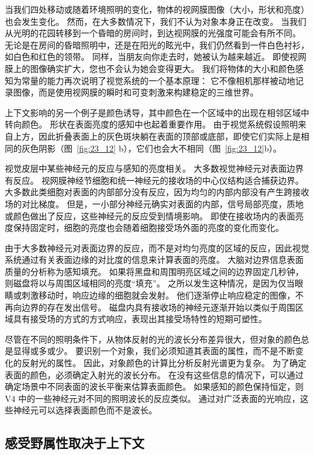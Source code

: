 当我们四处移动或随着环境照明的变化，物体的视网膜图像（大小，形状和亮度）也会发生变化。
然而，在大多数情况下，我们不认为对象本身正在改变。 
当我们从光明的花园转移到一个昏暗的房间时，到达视网膜的光强度可能会有所不同。
无论是在房间的昏暗照明中，还是在阳光的眩光中，我们仍然看到一件白色衬衫，如白色和红色的领带。
同样，当朋友向你走去时，她被认为越来越近。
即使视网膜上的图像确实扩大，您也不会认为她会变得更大。
我们将物体的大小和颜色感知为常量的能力再次说明了视觉系统的一个基本原理：
它不像相机那样被动地记录图像，而是使用视网膜的瞬时和可变刺激来构建稳定的三维世界。


上下文影响的另一个例子是颜色诱导，其中颜色在一个区域中的出现在相邻区域中转向颜色。
形状在表面亮度的感知中也起着重要作用。
由于视觉系统假设照明来自上方，因此折叠表面上的灰色斑块躺在表面的顶部或底部，即使它们实际上是相同的灰色阴影（图~\ref{fig:23_12}
b），它们也会大不相同（图~\ref{fig:23_12}b）。


视觉皮层中某些神经元的反应与感知的亮度相关。
大多数视觉神经元对表面边界有反应。
视网膜神经节细胞和统一神经元的接收场的中心仪结构适合捕获边界。
大多数此类细胞对表面的内部部分没有反应，因为均匀的内部内部没有产生跨接收场的对比梯度。
但是，一小部分神经元确实对表面的内部，信号局部亮度，质地或颜色做出了反应，这些神经元的反应受到情境影响。
即使在接收场内的表面亮度保持固定时，细胞的亮度也会随着细胞接受场外面的亮度的变化而变化。


由于大多数神经元对表面边界的反应，而不是对均匀亮度的区域的反应，因此视觉系统通过有关表面边缘的对比度的信息来计算表面的亮度。
大脑对边界信息表面质量的分析称为感知填充。
如果将黑盘和周围明亮区域之间的边界固定几秒钟，则磁盘将以与周围区域相同的亮度“填充”。
之所以发生这种情况，是因为仅当眼睛或刺激移动时，响应边缘的细胞就会发射。
他们逐渐停止响应稳定的图像，不再向边界的存在发出信号。
磁盘内具有接收场的神经元逐渐开始以类似于周围区域具有接受场的方式的方式响应，表现出其接受场特性的短期可塑性。


尽管在不同的照明条件下，从物体反射的光的波长分布差异很大，但对象的颜色总是显得或多或少。
要识别一个对象，我们必须知道其表面的属性，而不是不断变化的反射光的属性。
因此，对象颜色的计算比分析反射光谱更为复杂。
为了确定表面的颜色，必须确定入射光的波长分布。
在没有这些信息的情况下，可以通过确定场景中不同表面的波长平衡来估算表面颜色。
如果感知的颜色保持恒定，则 V4 中的一些神经元对不同的照明波长的反应类似。
通过对广泛表面的光响应，这些神经元可以选择表面颜色而不是波长。



\subsection{感受野属性取决于上下文}

